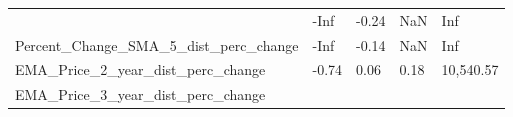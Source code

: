 \documentclass[]{article}
\begin{document}
\begin{longtable}[]{@{}lllll@{}}
\begin{minipage}[t]{0.49\columnwidth}
\end{minipage} & \begin{minipage}[t]{0.08\columnwidth}\raggedright\strut
-Inf\strut
\end{minipage} & \begin{minipage}[t]{0.09\columnwidth}\raggedright\strut
-0.24\strut
\end{minipage} & \begin{minipage}[t]{0.09\columnwidth}\raggedright\strut
NaN\strut
\end{minipage} & \begin{minipage}[t]{0.11\columnwidth}\raggedright\strut
Inf\strut
\end{minipage}\tabularnewline
\begin{minipage}[t]{0.49\columnwidth}\raggedright\strut
Percent\_Change\_SMA\_5\_dist\_perc\_change\strut
\end{minipage} & \begin{minipage}[t]{0.08\columnwidth}\raggedright\strut
-Inf\strut
\end{minipage} & \begin{minipage}[t]{0.09\columnwidth}\raggedright\strut
-0.14\strut
\end{minipage} & \begin{minipage}[t]{0.09\columnwidth}\raggedright\strut
NaN\strut
\end{minipage} & \begin{minipage}[t]{0.11\columnwidth}\raggedright\strut
Inf\strut
\end{minipage}\tabularnewline
\begin{minipage}[t]{0.49\columnwidth}\raggedright\strut
EMA\_Price\_2\_year\_dist\_perc\_change\strut
\end{minipage} & \begin{minipage}[t]{0.08\columnwidth}\raggedright\strut
-0.74\strut
\end{minipage} & \begin{minipage}[t]{0.09\columnwidth}\raggedright\strut
0.06\strut
\end{minipage} & \begin{minipage}[t]{0.09\columnwidth}\raggedright\strut
0.18\strut
\end{minipage} & \begin{minipage}[t]{0.11\columnwidth}\raggedright\strut
10,540.57\strut
\end{minipage}\tabularnewline
\begin{minipage}[t]{0.49\columnwidth}\raggedright\strut
EMA\_Price\_3\_year\_dist\_perc\_change\strut

\end{minipage}
\end{longtable}
\end{document}
